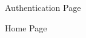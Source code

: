 \documentclass{article}
\begin{document}
\begin{figure}[htbp]
  \centering
  \caption{Authentication Page}
\end{figure}

\begin{figure}[htbp]
  \centering
  \caption{Home Page}
\end{figure}
\end{document}
